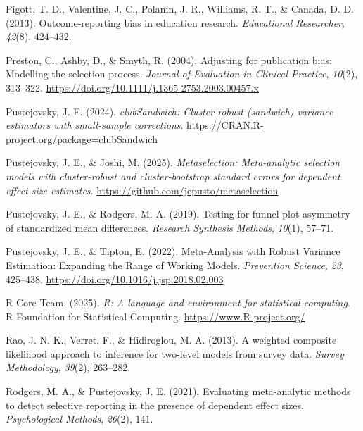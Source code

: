 \documentclass[
  man, donotrepeattitle,floatsintext]{apa7}
\newlength{\cslhangindent}
\newenvironment{CSLReferences}[2] %
 {\begin{list}{}{%
  \setlength{\itemindent}{0pt}
  \setlength{\leftmargin}{0pt}
  \setlength{\parsep}{0pt}
  \ifodd #1
   \setlength{\leftmargin}{\cslhangindent}
   \setlength{\itemindent}{-1\cslhangindent}
  \fi
  \setlength{\itemsep}{#2\baselineskip}}}
 {\end{list}}
\begin{document}
\begin{CSLReferences}{1}{0}
Pigott, T. D., Valentine, J. C., Polanin, J. R., Williams, R. T., \& Canada, D. D. (2013). Outcome-reporting bias in education research. \emph{Educational Researcher}, \emph{42}(8), 424--432.

Preston, C., Ashby, D., \& Smyth, R. (2004). Adjusting for publication bias: Modelling the selection process. \emph{Journal of Evaluation in Clinical Practice}, \emph{10}(2), 313--322. \url{https://doi.org/10.1111/j.1365-2753.2003.00457.x}

Pustejovsky, J. E. (2024). \emph{clubSandwich: Cluster-robust (sandwich) variance estimators with small-sample corrections}. \url{https://CRAN.R-project.org/package=clubSandwich}

Pustejovsky, J. E., \& Joshi, M. (2025). \emph{Metaselection: Meta-analytic selection models with cluster-robust and cluster-bootstrap standard errors for dependent effect size estimates}. \url{https://github.com/jepusto/metaselection}

Pustejovsky, J. E., \& Rodgers, M. A. (2019). Testing for funnel plot asymmetry of standardized mean differences. \emph{Research Synthesis Methods}, \emph{10}(1), 57--71.

Pustejovsky, J. E., \& Tipton, E. (2022). Meta-Analysis with Robust Variance Estimation: {Expanding} the Range of Working Models. \emph{Prevention Science}, \emph{23}, 425--438. \url{https://doi.org/10.1016/j.jsp.2018.02.003}

R Core Team. (2025). \emph{R: A language and environment for statistical computing}. R Foundation for Statistical Computing. \url{https://www.R-project.org/}

Rao, J. N. K., Verret, F., \& Hidiroglou, M. A. (2013). A weighted composite likelihood approach to inference for two-level models from survey data. \emph{Survey Methodology}, \emph{39}(2), 263--282.

Rodgers, M. A., \& Pustejovsky, J. E. (2021). Evaluating meta-analytic methods to detect selective reporting in the presence of dependent effect sizes. \emph{Psychological Methods}, \emph{26}(2), 141.


\end{CSLReferences}
\end{document}
